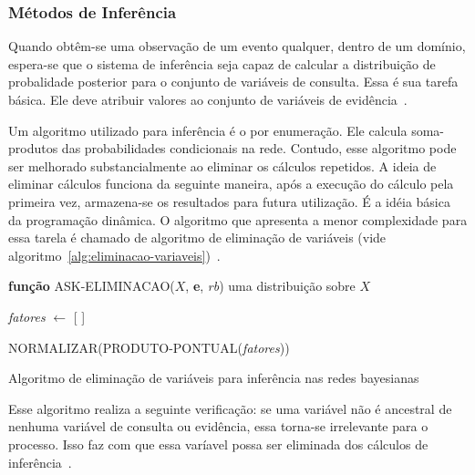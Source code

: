 \subsubsection{Métodos de Inferência}
Quando obtêm-se uma observação de um evento qualquer, dentro de um domínio, espera-se que o sistema de inferência seja capaz de calcular a distribuição de probalidade posterior para o conjunto de variáveis de consulta. Essa é sua tarefa básica. Ele deve atribuir valores ao conjunto de variáveis de evidência~\cite{russell:2002}.

Um algoritmo utilizado para inferência é o por enumeração. Ele calcula soma-produtos das probabilidades condicionais na rede. Contudo, esse algoritmo pode ser melhorado substancialmente ao eliminar os cálculos repetidos. A ideia de eliminar cálculos funciona da seguinte maneira, após a execução do cálculo pela primeira vez, armazena-se os resultados para futura utilização. É a idéia básica da programação dinâmica. O algoritmo que apresenta a menor complexidade para essa tarela é chamado de algoritmo de eliminação de variáveis (vide algoritmo~\ref{alg:eliminacao-variaveis})~\cite{russell:2002}.

\begin{algorithm}
    \textbf{função} ASK-ELIMINACAO($X$, \textbf{e}, \emph{rb}) \Retorna uma distribuição sobre $X$

    \emph{fatores} $\gets$ [ ]

    \Retorna NORMALIZAR(PRODUTO-PONTUAL(\emph{fatores}))
    \caption{Algoritmo de eliminação de variáveis para inferência nas redes bayesianas~\cite{russell:2002}}
    \label{alg:eliminacao-variaveis}
\end{algorithm}

Esse algoritmo realiza a seguinte verificação: se uma variável não é ancestral de nenhuma variável de consulta ou evidência, essa torna-se irrelevante para o processo. Isso faz com que essa varíavel possa ser eliminada dos cálculos de inferência~\cite{russell:2002}.
